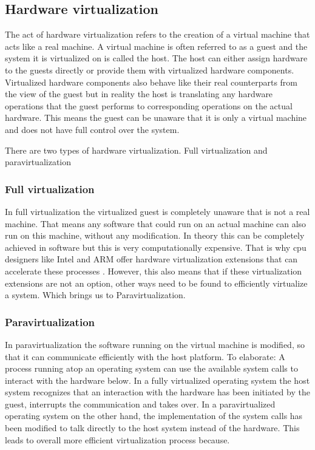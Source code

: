 \subsection{Hardware virtualization}
The act of hardware virtualization refers to the creation of a virtual machine that
acts like a real machine. A virtual machine is often referred to as a guest and the system it is virtualized on is called the host. The host can either assign hardware to the guests directly or provide them with virtualized hardware components. Virtualized hardware components also behave like their real counterparts from the view of the guest but in reality the host is translating any hardware operations that the guest performs to corresponding operations on the actual hardware. This means the guest can be unaware that it is only a virtual machine and does not have full control over the system.

There are two types of hardware virtualization. Full virtualization and paravirtualization
\subsubsection{Full virtualization}
In full virtualization the virtualized guest is completely unaware that is not a real machine. That means any software that could run on an actual machine can also run on this machine, without any modification.
In theory this can be completely achieved in software but this is very computationally expensive. That is why \acrshort{cpu} designers like Intel and ARM offer hardware virtualization extensions that can accelerate these processes \cite{uhlig2005intel}. However, this also means that if these virtualization extensions are not an option, other ways need to be found to efficiently virtualize a system. Which brings us to Paravirtualization.
\subsubsection{Paravirtualization}
In paravirtualization the software running on the virtual machine is modified, so that it can communicate efficiently with the host platform. To elaborate: A process running atop an operating system can use the available system calls to interact with the hardware below. In a fully virtualized operating system the host system recognizes that an interaction with the hardware has been initiated by the guest, interrupts the communication and takes over. In a paravirtualized operating system on the other hand, the implementation of the system calls has been modified to talk directly to the host system instead of the hardware. This leads to overall more efficient virtualization process because.

